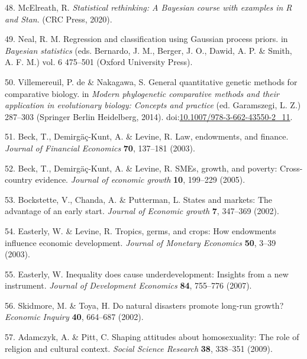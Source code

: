 \documentclass[english,man,floatsintext]{apa6}
\begin{document}
\leavevmode\hypertarget{ref-McElreath2020}{}%
48. McElreath, R. \emph{Statistical rethinking: A Bayesian course with examples in R and Stan}. (CRC Press, 2020).

\leavevmode\hypertarget{ref-Neal1998}{}%
49. Neal, R. M. Regression and classification using Gaussian process priors. in \emph{Bayesian statistics} (eds. Bernardo, J. M., Berger, J. O., Dawid, A. P. \& Smith, A. F. M.) vol. 6 475--501 (Oxford University Press).

\leavevmode\hypertarget{ref-deVillemereuil2014}{}%
50. Villemereuil, P. de \& Nakagawa, S. General quantitative genetic methods for comparative biology. in \emph{Modern phylogenetic comparative methods and their application in evolutionary biology: Concepts and practice} (ed. Garamszegi, L. Z.) 287--303 (Springer Berlin Heidelberg, 2014). doi:\href{https://doi.org/10.1007/978-3-662-43550-2_11}{10.1007/978-3-662-43550-2\_11}.

\leavevmode\hypertarget{ref-Beck2003}{}%
51. Beck, T., Demirgäç-Kunt, A. \& Levine, R. Law, endowments, and finance. \emph{Journal of Financial Economics} \textbf{70}, 137--181 (2003).

\leavevmode\hypertarget{ref-Beck2005}{}%
52. Beck, T., Demirgäç-Kunt, A. \& Levine, R. SMEs, growth, and poverty: Cross-country evidence. \emph{Journal of economic growth} \textbf{10}, 199--229 (2005).

\leavevmode\hypertarget{ref-Bockstette2002}{}%
53. Bockstette, V., Chanda, A. \& Putterman, L. States and markets: The advantage of an early start. \emph{Journal of Economic growth} \textbf{7}, 347--369 (2002).

\leavevmode\hypertarget{ref-Easterly2003}{}%
54. Easterly, W. \& Levine, R. Tropics, germs, and crops: How endowments influence economic development. \emph{Journal of Monetary Economics} \textbf{50}, 3--39 (2003).

\leavevmode\hypertarget{ref-Easterly2007}{}%
55. Easterly, W. Inequality does cause underdevelopment: Insights from a new instrument. \emph{Journal of Development Economics} \textbf{84}, 755--776 (2007).

\leavevmode\hypertarget{ref-Skidmore2002}{}%
56. Skidmore, M. \& Toya, H. Do natural disasters promote long-run growth? \emph{Economic Inquiry} \textbf{40}, 664--687 (2002).

\leavevmode\hypertarget{ref-Adamczyk2009}{}%
57. Adamczyk, A. \& Pitt, C. Shaping attitudes about homosexuality: The role of religion and cultural context. \emph{Social Science Research} \textbf{38}, 338--351 (2009).
\end{document}
